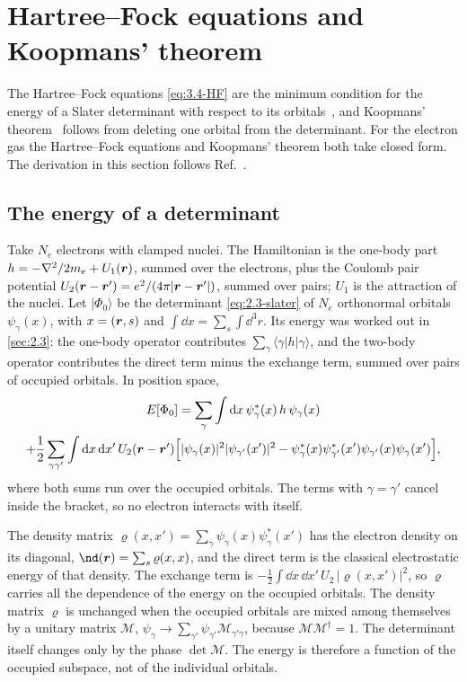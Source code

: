 \section{Hartree--Fock equations and Koopmans' theorem}\label{app:D.4}

The Hartree--Fock equations \cref{eq:3.4-HF} are the minimum condition for the energy of a Slater determinant with respect to its orbitals~\cite{fock1930naherungsmethode}, and Koopmans' theorem~\cite{koopmans1934zuordnung} follows from deleting one orbital from the determinant. For the electron gas the Hartree--Fock equations and Koopmans' theorem both take closed form. The derivation in this section follows Ref.~\cite[Chap.~2]{giuliani2005quantum}.

\subsection{The energy of a determinant}

Take $N_e$ electrons with clamped nuclei. The Hamiltonian is the one-body part $h = -\nabla^2/2m_e + U_1(\bm{r})$, summed over the electrons, plus the Coulomb pair potential $U_2(\bm{r} - \bm{r}') = e^2/(4\pi|\bm{r} - \bm{r}'|)$, summed over pairs; $U_1$ is the attraction of the nuclei. Let $|\Phi_0\rangle$ be the determinant \cref{eq:2.3-slater} of $N_e$ orthonormal orbitals $\psi_\gamma(x)$, with $x = (\bm{r}, s)$ and $\int\dd x = \sum_s\int\dd^3r$. Its energy was worked out in \cref{sec:2.3}: the one-body operator contributes $\sum_\gamma\langle\gamma|h|\gamma\rangle$, and the two-body operator contributes the direct term minus the exchange term, summed over pairs of occupied orbitals. In position space,
\begin{multline}
  E[\Phi_0] = \sum_\gamma\int\mathrm{d} x\,\psi^*_\gamma(x)\,h\,\psi_\gamma(x) \\
  + \frac12\sum_{\gamma\gamma'}\int\mathrm{d} x\,\mathrm{d} x'\,U_2(\bm{r} - \bm{r}')\Bigl[|\psi_\gamma(x)|^2|\psi_{\gamma'}(x')|^2 - \psi^*_\gamma(x)\psi^*_{\gamma'}(x')\psi_{\gamma'}(x)\psi_\gamma(x')\Bigr] ,
  \label{eq:D.4-energy}
\end{multline}
where both sums run over the occupied orbitals. The terms with $\gamma = \gamma'$ cancel inside the bracket, so no electron interacts with itself.

The density matrix $\varrho(x, x') = \sum_\gamma\psi_\gamma(x)\psi^*_\gamma(x')$ has the electron density on its diagonal, $\nd(\vect{r}) = \sum_s\varrho(x, x)$, and the direct term is the classical electrostatic energy of that density. The exchange term is $-\tfrac12\int\dd x\,\dd x'\,U_2\,|\varrho(x, x')|^2$, so $\varrho$ carries all the dependence of the energy on the occupied orbitals. The density matrix $\varrho$ is unchanged when the occupied orbitals are mixed among themselves by a unitary matrix $\mathcal{M}$, $\psi_\gamma \to \sum_{\gamma'}\psi_{\gamma'}\mathcal{M}_{\gamma'\gamma}$, because $\mathcal{M}\mathcal{M}^\dagger = 1$. The determinant itself changes only by the phase $\det\mathcal{M}$. The energy is therefore a function of the occupied subspace, not of the individual orbitals.

